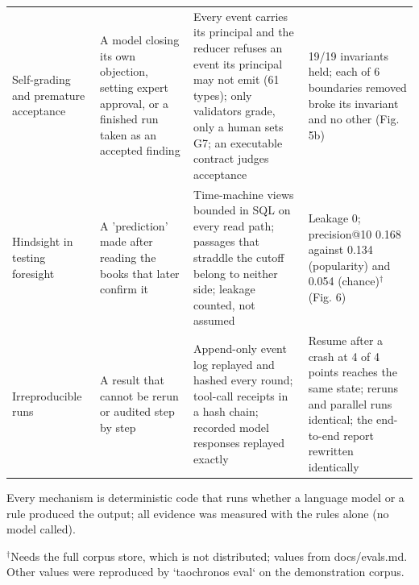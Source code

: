 \begin{table}[t]
\begin{tabular}{llll}
Self-grading and premature acceptance & A model closing its own objection, setting expert approval, or a finished run taken as an accepted finding & Every event carries its principal and the reducer refuses an event its principal may not emit (61 types); only validators grade, only a human sets G7; an executable contract judges acceptance & 19/19 invariants held; each of 6 boundaries removed broke its invariant and no other (Fig. 5b) \\
Hindsight in testing foresight & A 'prediction' made after reading the books that later confirm it & Time-machine views bounded in SQL on every read path; passages that straddle the cutoff belong to neither side; leakage counted, not assumed & Leakage 0; precision@10 0.168 against 0.134 (popularity) and 0.054 (chance)$^{\dagger}$ (Fig. 6) \\
Irreproducible runs & A result that cannot be rerun or audited step by step & Append-only event log replayed and hashed every round; tool-call receipts in a hash chain; recorded model responses replayed exactly & Resume after a crash at 4 of 4 points reaches the same state; reruns and parallel runs identical; the end-to-end report rewritten identically \\
\bottomrule
\end{tabular}
\par\footnotesize
Every mechanism is deterministic code that runs whether a language model or a rule produced the output; all evidence was measured with the rules alone (no model called).\par
$^{\dagger}$Needs the full corpus store, which is not distributed; values from docs/evals.md. Other values were reproduced by `taochronos eval` on the demonstration corpus.\par
\end{table}
